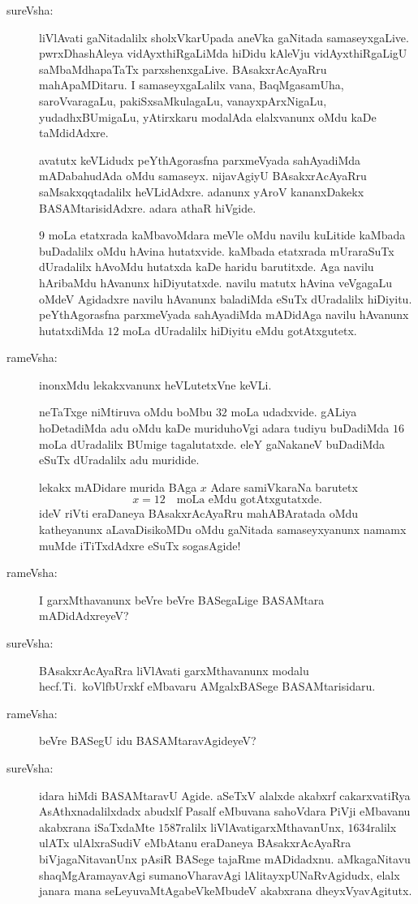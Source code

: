\begin{description}
\item[sureVsha:] liVlAvati gaNitadalilx sholxVkarUpada aneVka gaNitada samaseyxgaLive. pwrxDhashAleya vidAyxthiRgaLiMda hiDidu kAleVju vidAyxthiRgaLigU saMbaMdhapaTaTx parxshenxgaLive. BAsakxrAcAyaRru mahApaMDitaru. I samaseyxgaLalilx vana, BaqMgasamUha, saroVvaragaLu, pakiSxsaMkulagaLu, vanayxpArxNigaLu, yudadhxBUmigaLu, yAtirxkaru modalAda elalxvanunx oMdu kaDe taMdidAdxre.

avatutx keVLidudx peYthAgorasfna parxmeVyada sahAyadiMda mADabahudAda oMdu samaseyx. nijavAgiyU BAsakxrAcAyaRru saMsakxqqtadalilx heVLidAdxre. adanunx yAroV kananxDakekx BASAMtarisidAdxre. adara athaR hiVgide.

\qquad $9$ moLa etatxrada kaMbavoMdara meVle oMdu navilu kuLitide kaMbada buDadalilx oMdu hAvina hutatxvide. kaMbada etatxrada mUraraSuTx dUradalilx hAvoMdu hutatxda kaDe haridu barutitxde. Aga navilu hAribaMdu hAvanunx hiDiyutatxde. navilu matutx hAvina veVgagaLu oMdeV Agidadxre navilu hAvanunx baladiMda eSuTx dUradalilx hiDiyitu. peYthAgorasfna parxmeVyada sahAyadiMda mADidAga navilu hAvanunx hutatxdiMda $12$ moLa dUradalilx hiDiyitu eMdu gotAtxgutetx.

\item[rameVsha:] inonxMdu lekakxvanunx heVLutetxVne keVLi.

\qquad neTaTxge niMtiruva oMdu boMbu $32$ moLa udadxvide. gALiya hoDetadiMda adu oMdu kaDe muriduhoVgi adara tudiyu buDadiMda $16$ moLa dUradalilx BUmige tagalutatxde. eleY gaNakaneV buDadiMda eSuTx dUradalilx adu muridide.

lekakx mADidare murida BAga $x$ Adare samiVkaraNa barutetx
$$
x=12\text{~~ moLa eMdu gotAtxgutatxde.}
$$
ideV riVti eraDaneya BAsakxrAcAyaRru mahABAratada oMdu katheyanunx aLavaDisikoMDu oMdu gaNitada samaseyxyanunx namamx muMde iTiTxdAdxre eSuTx sogasAgide!

\item[rameVsha:] I garxMthavanunx beVre beVre BASegaLige BASAMtara mADidAdxreyeV?

\item[sureVsha:] BAsakxrAcAyaRra liVlAvati garxMthavanunx modalu hecf.Ti.\ koVlfbUrxkf eMbavaru AMgalxBASege BASAMtarisidaru.

\item[rameVsha:] beVre BASegU idu BASAMtaravAgideyeV?

\item[sureVsha:] idara hiMdi BASAMtaravU Agide. aSeTxV alalxde akabxrf cakarxvatiRya AsAthxnadalilxdadx abudxlf Pasalf eMbuvana sahoVdara PiVji eMbavanu akabxrana iSaTxdaMte $1587$ralilx liVlAvatigarxMthavanUnx, $1634$ralilx ulATx ulAlxraSudiV eMbAtanu eraDaneya BAsakxrAcAyaRra biVjagaNitavanUnx pAsiR BASege tajaRme mADidadxnu. aMkagaNitavu shaqMgAramayavAgi sumanoVharavAgi lAlitayxpUNaRvAgidudx, elalx janara mana seLeyuvaMtAgabeVkeMbudeV akabxrana dheyxVyavAgitutx.


\end{description}
